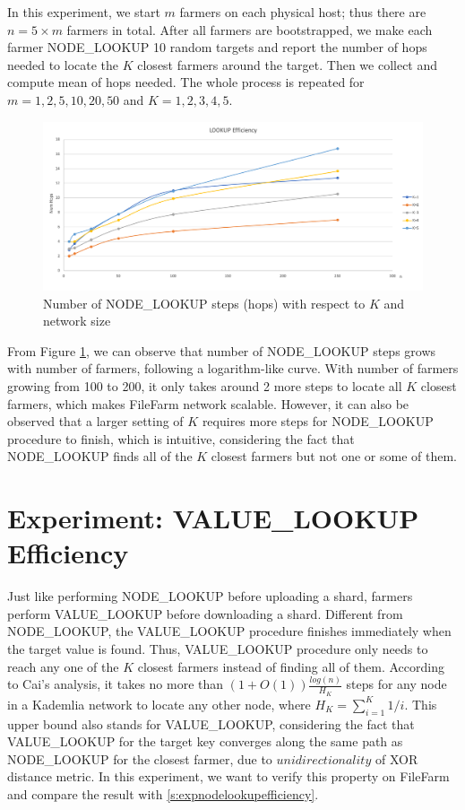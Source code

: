 In this experiment, we start $m$ farmers on each physical host; thus there are $n = 5 \times m$ farmers in total. After all farmers are bootstrapped, we make each farmer NODE\_LOOKUP 10 random targets and report the number of hops needed to locate the $K$ closest farmers around the target. Then we collect and compute mean of hops needed. The whole process is repeated for $m=1,2,5,10,20,50$ and $K=1,2,3,4,5$.

\begin{figure}[hbt]
\centering
  \includegraphics[width=14cm]{charts/chart_lookup_efficiency.png}
  \caption{Number of NODE\_LOOKUP steps (hops) with respect to $K$ and network size}
  \label{fig:lookupefficiency}
\end{figure}

From Figure \ref{fig:lookupefficiency}, we can observe that number of NODE\_LOOKUP steps grows with number of farmers, following a logarithm-like curve. With number of farmers growing from 100 to 200, it only takes around 2 more steps to locate all $K$ closest farmers, which makes FileFarm network scalable. However, it can also be observed that a larger setting of $K$ requires more steps for NODE\_LOOKUP procedure to finish, which is intuitive, considering the fact that NODE\_LOOKUP finds all of the $K$ closest farmers but not one or some of them.


\section{Experiment: VALUE\_LOOKUP Efficiency}
\label{s:expvaluelookupefficiency}

Just like performing NODE\_LOOKUP before uploading a shard, farmers perform VALUE\_LOOKUP before downloading a shard. Different from NODE\_LOOKUP, the VALUE\_LOOKUP procedure finishes immediately when the target value is found. Thus, VALUE\_LOOKUP procedure only needs to reach any one of the $K$ closest farmers instead of finding all of them. According to Cai's analysis\cite{cai2013probabilistic}, it takes no more than $(1+O(1))\frac{log(n)}{H_{K}}$ steps for any node in a Kademlia network to locate any other node, where $H_K = \sum_{i=1}^{K} 1/i$. This upper bound also stands for VALUE\_LOOKUP, considering the fact that VALUE\_LOOKUP for the target key converges along the same path as NODE\_LOOKUP for the closest farmer, due to $unidirectionality$ of XOR distance metric. In this experiment, we want to verify this property on FileFarm and compare the result with \ref{s:expnodelookupefficiency}.


